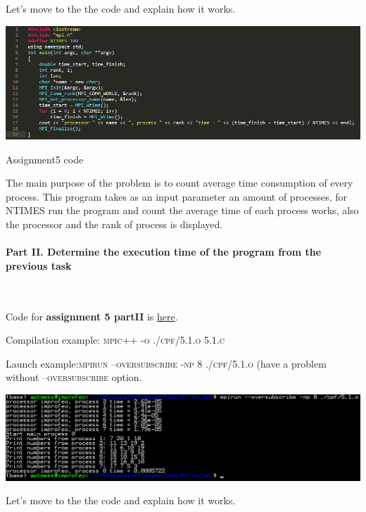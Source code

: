\documentclass[%
12pt, %
final, %
oneside, %
onecolumn, %
centertags]{article} %
\theoremstyle{plain}
\theoremstyle{definition}
\theoremstyle{remark}
\begin{document}
Let's move to the the code and explain how it works.

\begin{center}
\includegraphics[scale=0.75]{5.1.code.png}

Assignment5 code
\end{center}

The main purpose of the problem is to count average time consumption of every process. This program takes as an input parameter an amount of processes, for \textsc{NTIMES} run the program and count the average time of each process works, also the processor and the rank of process is displayed.

\paragraph{Part II. Determine the execution time of the program from the previous task}

$\ $

Code for \textbf{assignment 5 partII} is \href{https:\//github.com/aptmess/parallel_algorithms/blob/master/HT/hw_mpi/5.1.c}{here}.

Compilation example: \textsc{mpic++ -o ./cpf/5.1.o 5.1.c}

Launch example:\textsc{mpirun --oversubscribe -np 8 ./cpf/5.1.o} (have a problem without \textsc{--oversubscribe} option.

\begin{center}
\includegraphics[scale=0.55]{5.2.png}
\end{center}

Let's move to the the code and explain how it works.
\end{document}
